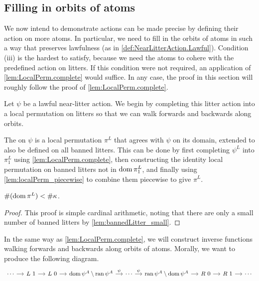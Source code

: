 \subsection{Filling in orbits of atoms}
We now intend to demonstrate actions can be made precise by defining their action on more atoms.
In particular, we need to fill in the orbits of atoms in such a way that preserves lawfulness (as in \cref{def:NearLitterAction.Lawful}).
Condition (iii) is the hardest to satisfy, because we need the atoms to cohere with the predefined action on litters.
If this condition were not required, an application of \cref{lem:LocalPerm.complete} would suffice.
In any case, the proof in this section will roughly follow the proof of \cref{lem:LocalPerm.complete}.

Let \( \psi \) be a lawful near-litter action.
We begin by completing this litter action into a local permutation on litters so that we can walk forwards and backwards along orbits.
\begin{definition}
    The  on \( \psi \) is a local permutation \( \pi^L \) that agrees with \( \psi \) on its domain, extended to also be defined on all banned litters.
    This can be done by first completing \( \psi^L \) into \( \pi^L_1 \) using \cref{lem:LocalPerm.complete}, then constructing the identity local permutation on banned litters not in \( \operatorname{dom} \pi^L_1 \), and finally using \cref{lem:localPerm_piecewise} to combine them piecewise to give \( \pi^L \).
\end{definition}
\begin{lemma}
    \( \#(\operatorname{dom} \pi^L) < \#\kappa \).
\end{lemma}
\begin{proof}
    This proof is simple cardinal arithmetic, noting that there are only a small number of banned litters by \cref{lem:bannedLitter_small}.
\end{proof}
In the same way as \cref{lem:LocalPerm.complete}, we will construct inverse functions walking forwards and backwards along orbits of atoms.
Morally, we want to produce the following diagram.
\[\begin{tikzcd}[column sep=small]
	\cdots & {L\ 1} & {L\ 0} & {\dom \psi^A \setminus \ran \psi^A} & \cdots & {\ran \psi^A \setminus \dom \psi^A} & {R\ 0} & {R\ 1} & \cdots
	\arrow[from=1-1, to=1-2]
	\arrow[from=1-2, to=1-3]
	\arrow[from=1-3, to=1-4]
	\arrow["\psi", from=1-4, to=1-5]
	\arrow["\psi", from=1-5, to=1-6]
	\arrow[from=1-6, to=1-7]
	\arrow[from=1-7, to=1-8]
	\arrow[from=1-8, to=1-9]
\end{tikzcd}\]
